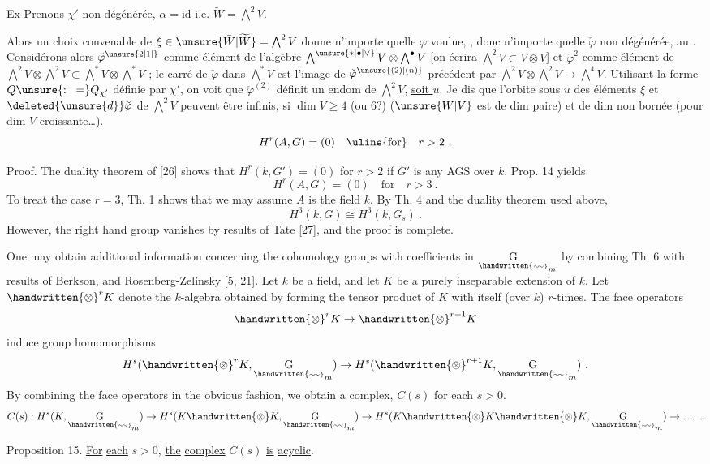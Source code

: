 \uline{Ex} Prenons $\chi'$ non dégénérée,  $\alpha=\mathrm{id}$ i.e. $\widetilde W=\bigwedge^2 V$.

Alors un choix convenable de $\xi\in\unsure{\bar W|\widetilde W}=\bigwedge^2 V$ donne n'importe quelle $\varphi$ voulue, , donc n'importe quelle $\check\varphi$  non dégénérée, au . Considérons alors $\check\varphi^{\unsure{2|1|{}}}$ comme élément de  l'algèbre $\bigwedge^{\unsure{*|\bullet|\vee}}V\otimes\bigwedge^\bullet V$ [on écrira $\bigwedge^2 V\subset V\otimes V$] et $\check\varphi^{2}$ comme élément de $\bigwedge^2 V\otimes\bigwedge^2 V\subset\bigwedge^*V\otimes\bigwedge^*V$ ; le carré de $\check\varphi$ dans $\bigwedge^*V$  est l'image de $\check\varphi^{\unsure{(2)|(n)}}$ précédent par $\bigwedge^2 V\otimes\bigwedge^2 V\longrightarrow\bigwedge^4 V$. Utilisant la forme $Q\unsure{:|=}Q_{\chi'}$ définie par $\chi'$, on voit que $\check\varphi^{(2)}$ définit un endom de $\bigwedge^2 V$, \uline{soit $u$}. Je dis que l'orbite sous $u$ des éléments $\xi$ et $\deleted{\unsure{d}}\check\varphi$ de $\bigwedge^2 V$ peuvent être infinis, si $\dim V\geq4$ (ou 6?) ($\unsure{W|V}$ est de dim paire)  et  de dim non bornée (pour dim $V$ croissante\ldots).
\[
H^r(A,G)=(0)\quad\text{\uline{for}}\quad r>2\ .
\]

Proof. The duality theorem of [26] shows that $H^r(k,G')=(0)$ for $r>2$ if $G'$ is any AGS over $k$. Prop. 14 yields
\[
H^r(A,G)=(0)\quad\text{for}\quad r>3\ .
\]
To treat the case $r=3$, Th. 1 shows that we may assume $A$ is the field $k$. By Th. 4 and the duality theorem used above,
\[
H^3(k,G)\cong H^3(k,G_s)\ .
\]
However, the right hand group vanishes by results of Tate [27], and the proof is complete.

One may obtain additional information concerning the cohomology groups with coefficients in $\underset{\handwritten{\scriptscriptstyle\sim\!\sim}}{\mathrm{G}}_m$ by combining Th. 6 with results of Berkson, and Rosenberg-Zelinsky [5, 21]. Let $k$ be a field, and let $K$ be a purely inseparable extension of $k$. Let $\handwritten{\otimes}^{r}K$ denote the $k$-algebra obtained by forming the tensor product of $K$ with itself (over $k$) $r$-times. The face operators
\[
\handwritten{\otimes}^{r}K\to\handwritten{\otimes}^{r+1}K
\]
induce group homomorphisms
\[
H^s(\handwritten{\otimes}^{r}K,\underset{\handwritten{\scriptscriptstyle\sim\!\sim}}{\mathrm G}_m)\to H^s(\handwritten{\otimes}^{r+1}K,\underset{\handwritten{\scriptscriptstyle\sim\!\sim}}{\mathrm G}_m)\ .
\]
By combining the face operators in the obvious fashion, we obtain a complex, $C(s)$ for each $s>0$.
\[
C(s):H^s(K,\underset{\handwritten{\scriptscriptstyle\sim\!\sim}}{\mathrm G}_m)\to H^s(K\handwritten{\otimes}K,\underset{\handwritten{\scriptscriptstyle\sim\!\sim}}{\mathrm G}_m)\to H^s(K\handwritten{\otimes}K\handwritten{\otimes}K,\underset{\handwritten{\scriptscriptstyle\sim\!\sim}}{\mathrm G}_m)\to\ldots\ .
\]

Proposition 15. \uline{For} \uline{each} $s>0$, \uline{the} \uline{complex} $C(s)$ \uline{is} \uline{acyclic}.
